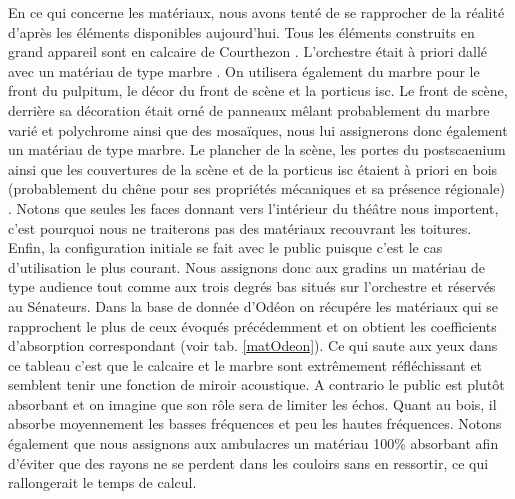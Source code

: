 En ce qui concerne les matériaux, nous avons tenté de se rapprocher de la réalité d'après les éléments disponibles aujourd'hui. Tous les éléments construits en grand appareil sont en calcaire de Courthezon \cite[p.43]{orangeTxt}. L'orchestre était à priori dallé avec un matériau de type marbre \cite[p.337]{orangeTxt}. On utilisera également du marbre pour le front du \gls{pulpitum}, le décor du front de scène et la \gls{porticus isc}. Le front de scène, derrière sa décoration était orné de panneaux mêlant probablement du marbre varié et polychrome ainsi que des mosaïques, nous lui assignerons donc également un matériau de type marbre. Le plancher de la scène, les portes du \gls{postscaenium} ainsi que les couvertures de la scène et de la \gls{porticus isc} étaient à priori en bois (probablement du chêne pour ses propriétés mécaniques et sa présence régionale) \cite[p.34]{formige}. Notons que seules les faces donnant vers l'intérieur du théâtre nous importent, c'est pourquoi nous ne traiterons pas des matériaux recouvrant les toitures. Enfin, la configuration initiale se fait avec le public puisque c'est le cas d'utilisation le plus courant. Nous assignons donc aux gradins un matériau de type audience tout comme aux trois degrés bas situés sur l'orchestre et réservés au Sénateurs. Dans la base de donnée d'Odéon \cite[materials]{odeon} on récupére les matériaux qui se rapprochent le plus de ceux évoqués précédemment et on obtient les coefficients d'absorption correspondant (voir tab. \ref{matOdeon}). Ce qui saute aux yeux dans ce tableau c'est que le calcaire et le marbre sont extrêmement réfléchissant et semblent tenir une fonction de miroir acoustique. A contrario le public est plutôt absorbant et on imagine que son rôle sera de limiter les échos. Quant au bois, il absorbe moyennement les basses fréquences et peu les hautes fréquences. Notons également que nous assignons aux ambulacres un matériau 100\% absorbant afin d'éviter que des rayons ne se perdent dans les couloirs sans en ressortir, ce qui rallongerait le temps de calcul.
%
